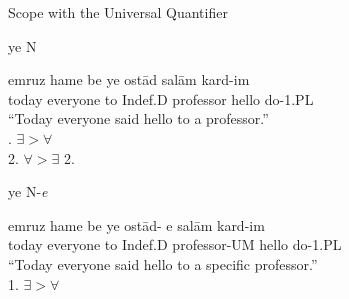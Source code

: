 \documentclass[10pt]{beamer}
\begin{document}
\begin {frame} {Scope with the Universal Quantifier}

\begin {exampleblock} {ye N}
	\begin {exe}
		\ex \label{} \gll	emruz hame be ye ost\={a}d sal\={a}m kard-im\\
					today everyone to {\scriptsize Indef.D} professor hello do-{\scriptsize 1.PL}\\
			``Today everyone said hello to a professor.'' \\ . $\exists > \forall$ \\ 2. $\forall > \exists$ 2. \\
	\end {exe}
\end {exampleblock}
\pause
\begin {exampleblock} {ye N-\emph{{\color {red}e}}}
	\begin {exe}
		\ex \label{} \gll	emruz hame be ye ost\={a}d-{\color {red} e} sal\={a}m kard-im\\
					today everyone to {\scriptsize Indef.D} professor-{\scriptsize UM} hello do-{\scriptsize 1.PL}\\
			``Today everyone said hello to a specific professor.'' \\ 1. $\exists > \forall$\\
	\end {exe}
\end {exampleblock}

\end {frame}

\end{document}
